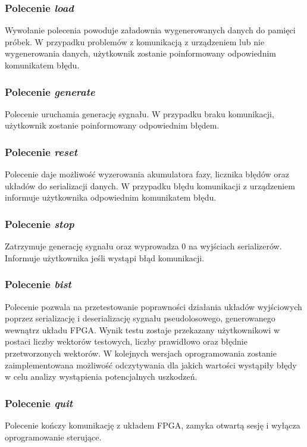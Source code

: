         \subsubsection{Polecenie \textit{load}}
            Wywołanie polecenia powoduje załadownia wygenerowanych danych do pamięci próbek. 
            W przypadku problemów z komunikacją z urządzeniem lub nie wygenerowania danych, 
            użytkownik zostanie poinformowany odpowiednim komunikatem błędu. 
        \subsubsection{Polecenie \textit{generate}}
            Polecenie uruchamia generację sygnału. W przypadku braku komunikacji, 
            użytkownik zostanie poinformowany odpowiednim błędem.
        \subsubsection{Polecenie \textit{reset}}
            Polecenie daje możliwość wyzerowania akumulatora fazy, licznika błędów oraz układów do serializacji danych. 
            W przypadku błędu komunikacji z urządzeniem informuje użytkownika odpowiednim komunikatem błędu. 
        \subsubsection{Polecenie \textit{stop}}
            Zatrzymuje generację sygnału oraz wyprowadza $0$ na wyjściach serializerów. 
            Informuje użytkownika jeśli wystąpi błąd komunikacji. 
        \subsubsection{Polecenie \textit{bist}}
            Polecenie pozwala na przetestowanie poprawności działania układów wyjściowych poprzez serializację i deserializację 
            sygnału pseudolosowego, generowanego wewnątrz układu FPGA. Wynik testu zostaje przekazany użytkownikowi w postaci 
            liczby wektorów testowych, liczby prawidłowo oraz błędnie przetworzonych wektorów. 
            W kolejnych wersjach oprogramowania zostanie zaimplementowana możliwość odczytywania dla jakich 
            wartości wystąpiły błędy w celu analizy wystąpienia potencjalnych uszkodzeń. 
        \subsubsection{Polecenie \textit{quit}}
            Polecenie kończy komunikację z układem FPGA, zamyka otwartą sesję i wyłącza oprogramowanie sterujące. 